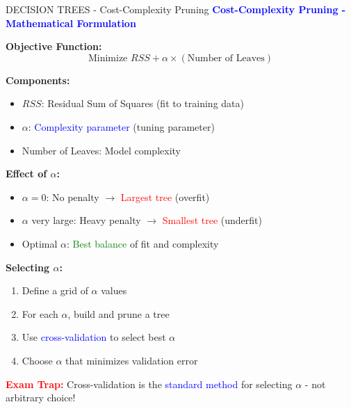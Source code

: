 \documentclass[8pt]{beamer}
\begin{document}
	\begin{frame}{DECISION TREES - Cost-Complexity Pruning}
		\fontsize{6.5}{7.5}\selectfont
		\textcolor{blue}{\textbf{Cost-Complexity Pruning - Mathematical Formulation}}
		
		\textbf{Objective Function:}
		\[
		\text{Minimize } RSS + \alpha \times (\text{Number of Leaves})
		\]
		
		\textbf{Components:}
		\begin{itemize}
			\item $RSS$: Residual Sum of Squares (fit to training data)
			\item $\alpha$: \textcolor{blue}{Complexity parameter} (tuning parameter)
			\item Number of Leaves: Model complexity
		\end{itemize}
		
		\textbf{Effect of $\alpha$:}
		\begin{itemize}
			\item $\alpha = 0$: No penalty $\rightarrow$ \textcolor{red}{Largest tree} (overfit)
			\item $\alpha$ very large: Heavy penalty $\rightarrow$ \textcolor{red}{Smallest tree} (underfit)
			\item Optimal $\alpha$: \textcolor{green}{Best balance} of fit and complexity
		\end{itemize}
		
		\textbf{Selecting $\alpha$:}
		\begin{enumerate}
			\item Define a grid of $\alpha$ values
			\item For each $\alpha$, build and prune a tree
			\item Use \textcolor{blue}{cross-validation} to select best $\alpha$
			\item Choose $\alpha$ that minimizes validation error
		\end{enumerate}
		
		\textcolor{red}{\textbf{Exam Trap:}} Cross-validation is the \textcolor{blue}{standard method} for selecting $\alpha$ - not arbitrary choice!
	\end{frame}
	
\end{document}
